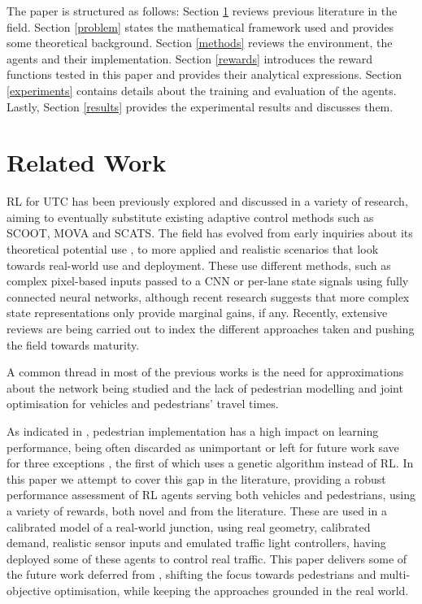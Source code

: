 \documentclass[sigconf,anonymous]{aamas}
\begin{document}
The paper is structured as follows:
Section \ref{lit} reviews previous literature in the field.
Section \ref{problem} states the mathematical framework used and provides some theoretical background.  
Section \ref{methods} reviews the environment, the agents and their implementation.
Section \ref{rewards} introduces the reward functions tested in this paper and provides their analytical expressions.
Section \ref{experiments} contains details about the training and evaluation of the agents.
Lastly, Section \ref{results} provides the experimental results and discusses them.
\section{Related Work}
\label{lit}
RL for UTC has been previously explored and discussed in a variety of research, aiming to eventually substitute existing adaptive control methods such as SCOOT\cite{scoot}, MOVA\cite{mova} and SCATS\cite{scats}.
The field has evolved from early inquiries about its theoretical potential use \cite{wiering2000} \cite{abdul2003} \cite{pra2010} \cite{abdulhai2010} \cite{abdoos2011}, to more applied and realistic scenarios \cite{survey2014} \cite{genders2016} \cite{liang2017} \cite{gendersthesis} \cite{gao2017} \cite{mousavi2017} \cite{wan2018} \cite{liang2018} \cite{aslani2019} \cite{genders2019} that look towards real-world use and deployment.
These use different methods, such as complex pixel-based inputs passed to a CNN or per-lane state signals using fully connected neural networks, although recent research suggests that more complex state representations only provide marginal gains, if any\cite{gendersstate}.
Recently, extensive reviews are being carried out \cite{mannion} \cite{survey2020} \cite{survey2020wei} to index the different approaches taken and pushing the field towards maturity.

A common thread in most of the previous works is the need for approximations about the network being studied and the lack of pedestrian modelling and joint optimisation for vehicles and pedestrians' travel times.

As indicated in \cite{survey2020}, pedestrian implementation has a high impact on learning performance, being often discarded as unimportant or left for future work save for three exceptions \cite{geneticped} \cite{liu2017} \cite{chen2020}, the first of which uses a genetic algorithm instead of RL.
In this paper we attempt to cover this gap in the literature, providing a robust performance assessment of RL agents serving both vehicles and pedestrians, using a variety of rewards, both novel and from the literature.
These are used in a calibrated model of a real-world junction, using real geometry, calibrated demand, realistic sensor inputs and emulated traffic light controllers, having deployed some of these agents to control real traffic.
This paper delivers some of the future work  deferred from \cite{previous}, shifting the focus towards pedestrians and multi-objective optimisation, while keeping the approaches grounded in the real world.
\end{document}
